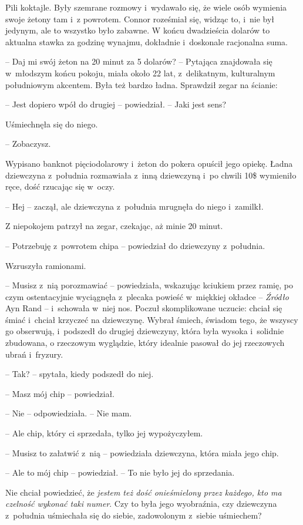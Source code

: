 \documentclass[oneside,polish,11pt,rmheadings]{mwbk}
\begin{document}
Pili koktajle. Były szemrane rozmowy i~wydawało się, że wiele osób wymienia swoje żetony tam i~z powrotem. Connor roześmiał się, widząc to, i~nie był jedynym, ale to wszystko było zabawne. W końcu dwadzieścia dolarów to aktualna stawka za godzinę wynajmu, dokładnie i~doskonale racjonalna suma.

-- Daj mi swój żeton na 20 minut za 5 dolarów? -- Pytająca znajdowała się w~młodszym końcu pokoju, miała około 22 lat, z~delikatnym, kulturalnym południowym akcentem. Była też bardzo ładna. Sprawdził zegar na ścianie: 

-- Jest dopiero wpół do drugiej -- powiedział. -- Jaki jest sens? 

Uśmiechnęła się do niego. 

-- Zobaczysz. 

Wypisano banknot pięciodolarowy i~żeton do pokera opuścił jego opiekę. Ładna dziewczyna z~południa rozmawiała z~inną dziewczyną i~po chwili 10\$ wymieniło ręce, dość rzucając się w~oczy. 

-- Hej -- zaczął, ale dziewczyna z~południa mrugnęła do niego i~zamilkł.

Z niepokojem patrzył na zegar, czekając, aż minie 20 minut. 

-- Potrzebuję z~powrotem chipa -- powiedział do dziewczyny z~południa.

Wzruszyła ramionami. 

-- Musisz z~nią porozmawiać -- powiedziała, wskazując kciukiem przez ramię, po czym ostentacyjnie wyciągnęła z~plecaka powieść w~miękkiej okładce -- \textit{Źródło} Ayn Rand -- i~schowała w~niej nos. Poczuł skomplikowane uczucie: chciał się śmiać i~chciał krzyczeć na dziewczynę. Wybrał śmiech, świadom tego, że wszyscy go obserwują, i~podszedł do drugiej dziewczyny, która była wysoka i~solidnie zbudowana, o rzeczowym wyglądzie, który idealnie pasował do jej rzeczowych ubrań i~fryzury.

-- Tak? -- spytała, kiedy podszedł do niej.

-- Masz mój chip -- powiedział.

-- Nie -- odpowiedziała. -- Nie mam. 

-- Ale chip, który ci sprzedała, tylko jej wypożyczyłem.

-- Musisz to załatwić z~nią -- powiedziała dziewczyna, która miała jego chip. 

-- Ale to mój chip -- powiedział. -- To nie było jej do sprzedania. 

Nie chciał powiedzieć, że \textit{jestem też dość onieśmielony przez każdego, kto ma czelność wykonać taki numer}. Czy to była jego wyobraźnia, czy dziewczyna z~południa uśmiechała się do siebie, zadowolonym z~siebie uśmiechem?
\end{document}
